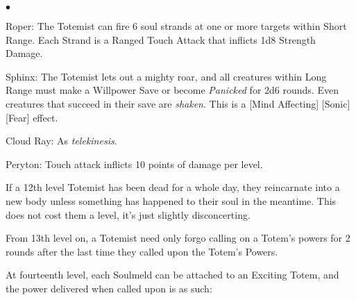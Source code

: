 {\begin{list}{$\bullet$}{\itemspace}
\item Roper: The Totemist can fire 6 soul strands at one or more targets within Short Range. Each Strand is a Ranged Touch Attack that inflicts 1d8 Strength Damage.
\item Sphinx: The Totemist lets out a mighty roar, and all creatures within Long Range must make a Willpower Save or become \emph{Panicked} for 2d6 rounds. Even creatures that succeed in their save are \emph{shaken}. This is a [Mind Affecting] [Sonic] [Fear] effect.
\item Cloud Ray: As \emph{telekinesis}.
\item Peryton: Touch attack inflicts 10 points of damage per level.
\item 
\end{list}}

 If a 12th level Totemist has been dead for a whole day, they reincarnate into a new body unless something has happened to their soul in the meantime. This does not cost them a level, it's just slightly disconcerting.

 From 13th level on, a Totemist need only forgo calling on a Totem's powers for 2 rounds after the last time they called upon the Totem's Powers.

 At fourteenth level, each Soulmeld can be attached to an Exciting Totem, and the power delivered when called upon is as such:

